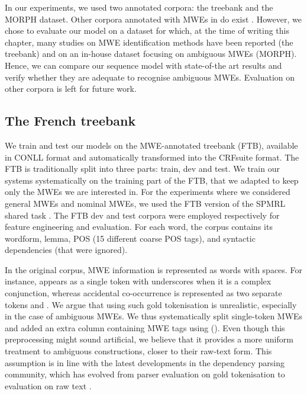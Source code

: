 \documentclass[output=paper,modfonts]{langscibook}
\begin{document}
In our experiments, we used two annotated corpora: the  treebank and the MORPH dataset. Other corpora annotated with MWEs in  do exist \citep{Laporteetal08a,MWEWorkshop}. However, we chose to evaluate our model on a dataset for which, at the time of writing this chapter, many studies on MWE identification methods have been reported (the  treebank) and on an in-house dataset focusing on ambiguous MWEs (MORPH). Hence, we can compare our sequence model with state-of-the art results and verify whether they are adequate to recognise ambiguous MWEs. Evaluation on other corpora is left for future work.
 
\subsection{The French treebank} 
\label{subsec:ftb}

We train and test our models on the MWE-annotated  treebank (FTB), available in CONLL format and automatically transformed into the CRFsuite format. The FTB is traditionally split into three parts: train, dev and test. We train our systems systematically on the training part of the FTB, that we adapted to keep only the MWEs we are interested in. For the experiments where we considered general MWEs and nominal MWEs, we used the FTB version of the SPMRL shared task \citep{seddah-EtAl:2013:SPMRL}. The FTB dev and test corpora were employed respectively for feature engineering and evaluation.  For each word, the corpus contains its wordform, lemma, POS (15 different coarse POS tags), and syntactic dependencies (that were ignored).

In the original corpus, MWE information is represented as words with spaces. 
For instance,  appears as a single token with underscores when it is a complex conjunction, whereas accidental co-occurrence is represented as two separate tokens  and .
We argue that using such gold tokenisation is unrealistic, especially in the case of ambiguous MWEs.
We thus systematically split single-token MWEs and added an extra column containing MWE tags using  ().
Even though this preprocessing might sound artificial, we believe that it provides a more uniform treatment to ambiguous constructions, closer to their raw-text form.
This assumption is in line with the latest developments in the dependency parsing community, which has evolved from parser evaluation on gold tokenisation \citep{Buchholz:2006:CST:1596276.1596305} to evaluation on raw text \citep{zeman-EtAl:2017:K17-3}.
\end{document}

